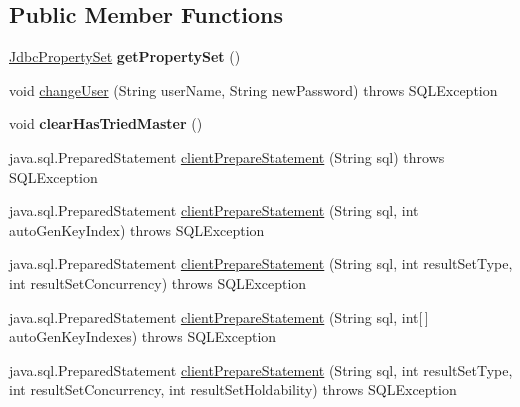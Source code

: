 \subsection*{Public Member Functions}
\begin{DoxyCompactItemize}
\item 
\mbox{\label{interfacecom_1_1mysql_1_1cj_1_1jdbc_1_1_jdbc_connection_a8d7309165f9280946c8ac7a4fb8a22c7}} 
\mbox{\hyperlink{interfacecom_1_1mysql_1_1cj_1_1jdbc_1_1_jdbc_property_set}{Jdbc\+Property\+Set}} {\bfseries get\+Property\+Set} ()
\item 
void \mbox{\hyperlink{interfacecom_1_1mysql_1_1cj_1_1jdbc_1_1_jdbc_connection_aed0496e0f2c1236f2784f92b45a482ef}{change\+User}} (String user\+Name, String new\+Password)  throws S\+Q\+L\+Exception
\item 
\mbox{\label{interfacecom_1_1mysql_1_1cj_1_1jdbc_1_1_jdbc_connection_a0594dd85b684e0141c3260245cbb28e0}} 
void {\bfseries clear\+Has\+Tried\+Master} ()
\item 
java.\+sql.\+Prepared\+Statement \mbox{\hyperlink{interfacecom_1_1mysql_1_1cj_1_1jdbc_1_1_jdbc_connection_a62db1ccf7a070833775481acb5e9e359}{client\+Prepare\+Statement}} (String sql)  throws S\+Q\+L\+Exception
\item 
java.\+sql.\+Prepared\+Statement \mbox{\hyperlink{interfacecom_1_1mysql_1_1cj_1_1jdbc_1_1_jdbc_connection_a1d01e4f2fd60084794906cc9a1c24c24}{client\+Prepare\+Statement}} (String sql, int auto\+Gen\+Key\+Index)  throws S\+Q\+L\+Exception
\item 
java.\+sql.\+Prepared\+Statement \mbox{\hyperlink{interfacecom_1_1mysql_1_1cj_1_1jdbc_1_1_jdbc_connection_a55c0d38bcf8ca54ed272a0a1bbbf7e4c}{client\+Prepare\+Statement}} (String sql, int result\+Set\+Type, int result\+Set\+Concurrency)  throws S\+Q\+L\+Exception
\item 
java.\+sql.\+Prepared\+Statement \mbox{\hyperlink{interfacecom_1_1mysql_1_1cj_1_1jdbc_1_1_jdbc_connection_a11927338ef48e164fdd8444b6b273162}{client\+Prepare\+Statement}} (String sql, int\mbox{[}$\,$\mbox{]} auto\+Gen\+Key\+Indexes)  throws S\+Q\+L\+Exception
\item 
java.\+sql.\+Prepared\+Statement \mbox{\hyperlink{interfacecom_1_1mysql_1_1cj_1_1jdbc_1_1_jdbc_connection_a802cf843e62a0feac95a16c7750a35c3}{client\+Prepare\+Statement}} (String sql, int result\+Set\+Type, int result\+Set\+Concurrency, int result\+Set\+Holdability)  throws S\+Q\+L\+Exception

\end{DoxyCompactItemize}

